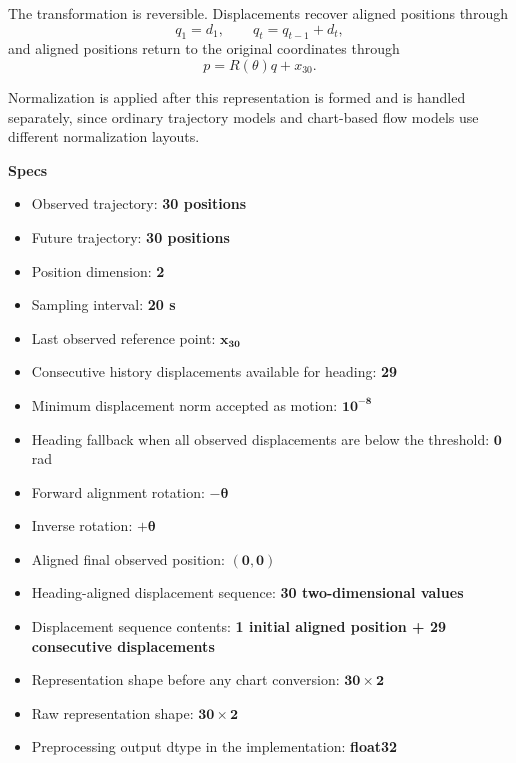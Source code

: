 \documentclass[11pt]{article}
\begin{document}
The transformation is reversible. Displacements recover aligned positions through
\[
q_1=d_1,
\qquad
q_t=q_{t-1}+d_t,
\]
and aligned positions return to the original coordinates through
\[
p=R(\theta)q+x_{30}.
\]

Normalization is applied after this representation is formed and is handled separately, since ordinary trajectory models and chart-based flow models use different normalization layouts.

\newpage
{\large\bfseries Specs}\par

\begin{itemize}
\item Observed trajectory: \textbf{30 positions}
\item Future trajectory: \textbf{30 positions}
\item Position dimension: \textbf{2}
\item Sampling interval: \textbf{20 s}
\item Last observed reference point: \(\mathbf{x_{30}}\)
\item Consecutive history displacements available for heading: \textbf{29}
\item Minimum displacement norm accepted as motion: \(\mathbf{10^{-8}}\)
\item Heading fallback when all observed displacements are below the threshold: \(\mathbf{0}\) rad
\item Forward alignment rotation: \(\mathbf{-\theta}\)
\item Inverse rotation: \(\mathbf{+\theta}\)
\item Aligned final observed position: \(\mathbf{(0,0)}\)
\item Heading-aligned displacement sequence: \textbf{30 two-dimensional values}
\item Displacement sequence contents: \textbf{1 initial aligned position + 29 consecutive displacements}
\item Representation shape before any chart conversion: \(\mathbf{30\times2}\)
\item Raw representation shape: \(\mathbf{30\times2}\)
\item Preprocessing output dtype in the implementation: \textbf{float32}
\end{itemize}
\end{document}
